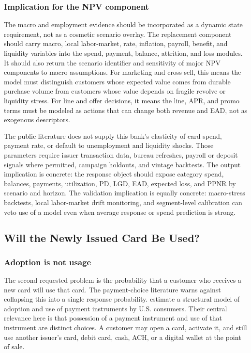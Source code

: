 \documentclass[11pt]{article}
\newcommand{\1}{\mathbf{1}}
\begin{document}
\subsubsection{Implication for the NPV component}
\label{subsec:macro-component-implication}

The macro and employment evidence should be incorporated as a dynamic state
requirement, not as a cosmetic scenario overlay. The replacement component
should carry macro, local labor-market, rate, inflation, payroll, benefit, and
liquidity variables into the spend, payment, balance, attrition, and loss
modules. It should also return the scenario identifier and sensitivity of
major NPV components to macro assumptions. For marketing and cross-sell, this
means the model must distinguish customers whose expected value comes from
durable purchase volume from customers whose value depends on fragile revolve
or liquidity stress. For line and offer decisions, it means the line, APR, and
promo terms must be modeled as actions that can change both revenue and EAD,
not as exogenous descriptors.

The public literature does not supply this bank's elasticity of card spend,
payment rate, or default to unemployment and liquidity shocks. Those
parameters require issuer transaction data, bureau refreshes, payroll or
deposit signals where permitted, campaign holdouts, and vintage backtests. The
output implication is concrete: the response object should expose category
spend, balances, payments, utilization, PD, LGD, EAD, expected loss, and PPNR
by scenario and horizon. The validation implication is equally concrete:
macro-stress backtests, local labor-market drift monitoring, and segment-level
calibration can veto use of a model even when average response or spend
prediction is strong.

\subsection{Will the Newly Issued Card Be Used?}
\label{sec:usage}

\subsubsection{Adoption is not usage}

The second requested problem is the probability that a customer who receives a
new card will use that card. The payment-choice literature warns against
collapsing this into a single response probability. \citet{koulayev2012payment}
estimate a structural model of adoption and use of payment instruments by U.S.
consumers. Their central relevance here is that possession of a payment
instrument and use of that instrument are distinct choices. A customer may open
a card, activate it, and still use another issuer's card, debit card, cash, ACH,
or a digital wallet at the point of sale.
\end{document}
